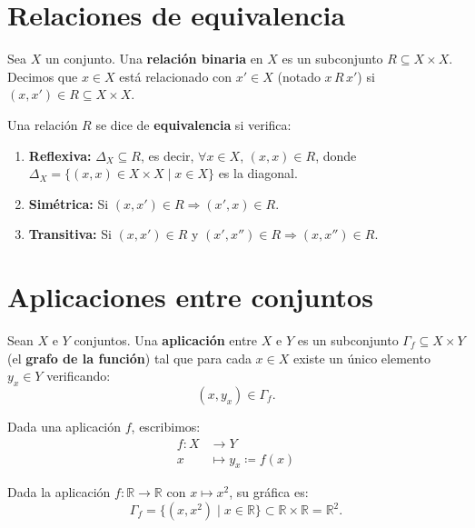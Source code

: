 \section{Relaciones de equivalencia}

Sea $X$ un conjunto. Una \textbf{relación binaria} en $X$ es un subconjunto $R \subseteq X \times X$. Decimos que $x \in X$ está relacionado con $x' \in X$ (notado $x \, R \, x'$) si $(x, x') \in R \subseteq X \times X$.

\begin{defi}
Una relación $R$ se dice de \textbf{equivalencia} si verifica:
\begin{enumerate}
    \item[\textbf{a)}] \textbf{Reflexiva:} $\Delta_X \subseteq R$, es decir, $\forall x \in X$, $(x, x) \in R$, donde $\Delta_X = \{(x, x) \in X \times X \mid x \in X\}$ es la diagonal.
    \item[\textbf{b)}] \textbf{Simétrica:} Si $(x, x') \in R \Rightarrow (x', x) \in R$.
    \item[\textbf{c)}] \textbf{Transitiva:} Si $(x, x') \in R$ y $(x', x'') \in R \Rightarrow (x, x'') \in R$.
\end{enumerate}
\end{defi}

\section{Aplicaciones entre conjuntos}

\begin{defi}
Sean $X$ e $Y$ conjuntos. Una \textbf{aplicación} entre $X$ e $Y$ es un subconjunto $\Gamma_f \subseteq X \times Y$ (el \textbf{grafo de la función}) tal que para cada $x \in X$ existe un único elemento $y_x \in Y$ verificando:
$$
    (x, y_x) \in \Gamma_f \text{}.
$$
\end{defi}

\begin{nota}
Dada una aplicación $f$, escribimos:
$$
    \begin{aligned}
        f \colon X &\longrightarrow Y \text{} \\
        x &\longmapsto y_x \coloneqq f(x) \text{}
    \end{aligned}
$$
\end{nota}

\begin{ejem}
Dada la aplicación $f \colon \mathbb{R} \to \mathbb{R}$ con $x \mapsto x^2$, su gráfica es:
$$
    \Gamma_f = \{(x, x^2) \mid x \in \mathbb{R}\} \subset \mathbb{R} \times \mathbb{R} = \mathbb{R}^2 \text{}.
$$
\end{ejem}



